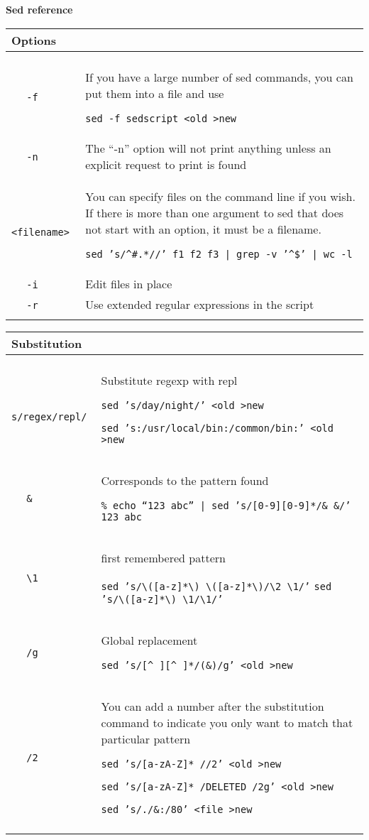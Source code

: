 \documentclass[a4paper,10pt,landscape,twocolumn]{article}
\newcommand{\commanddescr}[2]{\small ~~ \texttt{#1} & \small #2 \smallskip \\ }
\newenvironment{mycommands}[1]
               { \begin{tabular}{lp{9cm}} \\
                   \large{\textbf{#1}} \medskip \\ \hline \\}
               { \\ \hline \end{tabular} \medskip }
\newcommand{\sedex}[1]{\textcolor[gray]{0.40}{\texttt{#1}}}
\begin{document}
\textbf{\Huge{Sed reference}} \\

\begin{mycommands}{Options}
  
  \commanddescr{-f}{
    If you have a large number of sed commands, you 
    can put them into a file and use 

    \sedex{sed -f sedscript <old >new}
  }

  \commanddescr{-n}{ 
    The ``-n'' option will not print anything unless an
    explicit request to print is found 
  }

  \commanddescr{<filename>}{
    You can specify files on the command line if you wish. If there is
    more than one argument to sed that does not start with an option, it
    must be a filename.

    \sedex{sed 's/\^{}\#{}.*//' f1 f2 f3 | grep -v '\^{}\${}' | wc -l}
  }

  \commanddescr{-i}{
    Edit files in place 
  }

  \commanddescr{-r}{
    Use extended regular expressions in the script
  }

\end{mycommands}

\begin{mycommands}{Substitution}
  \commanddescr{s/regex/repl/}{ 
    Substitute regexp with repl 

    \sedex{sed 's/day/night/' <old >new }

    \sedex{sed 's:/usr/local/bin:/common/bin:' <old >new }}

  \commanddescr{\&}{
    Corresponds to the pattern found

    \sedex{\%{} echo ``123 abc'' | sed 's/[0-9][0-9]*/\& \&/'\newline
      123 123 abc}
  }

  \commanddescr{\textbackslash 1}{
    first remembered pattern

    \sedex{sed 's/\textbackslash([a-z]*\textbackslash) \textbackslash([a-z]*\textbackslash)/\textbackslash2 \textbackslash1/'}\newline
    \sedex{sed 's/\textbackslash([a-z]*\textbackslash) \textbackslash1/\textbackslash1/'}
  }
  
  \commanddescr{/g}{
    Global replacement

    \sedex{sed 's/[\^{} ][\^{} ]*/(\&{})/g' <old >new}
  }

  \commanddescr{/2}{
    You can add a number after the substitution command to indicate you only want to match that particular pattern

    \sedex{sed 's/[a-zA-Z]* //2' <old >new}

    \sedex{sed 's/[a-zA-Z]* /DELETED /2g' <old >new}

    \sedex{sed 's/./\&{}:/80' <file >new}

  }
\end{mycommands}
\end{document}
